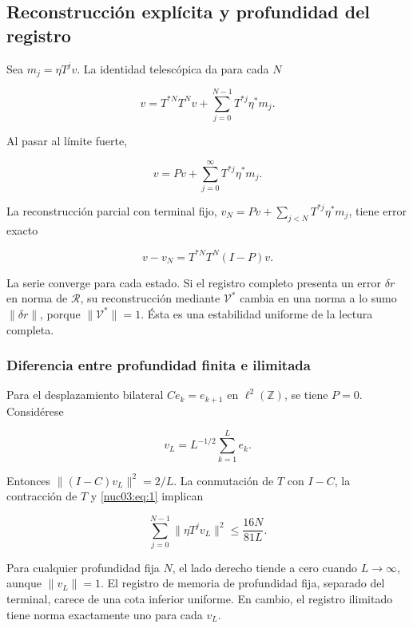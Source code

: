 \subsection{Reconstrucción explícita y profundidad del registro}

Sea \(m_j=\eta T^jv\). La identidad telescópica da para cada \(N\)

\begin{equation}
\boxed{v=T^{*N}T^Nv+\sum_{j=0}^{N-1}T^{*j}\eta^*m_j.}
\label{nuc03:eq:8}
\end{equation}

Al pasar al límite fuerte,

\begin{equation}
\boxed{v=Pv+\sum_{j=0}^{\infty}T^{*j}\eta^*m_j.}
\label{nuc03:eq:9}
\end{equation}

La reconstrucción parcial con terminal fijo,
\(v_N=Pv+\sum_{j<N}T^{*j}\eta^*m_j\), tiene error exacto

\begin{equation}
v-v_N=T^{*N}T^N(I-P)v.
\label{nuc03:eq:10}
\end{equation}

La serie converge para cada estado. Si el registro completo presenta un error \(\delta r\) en norma de \(\mathcal R\), su reconstrucción mediante \(\mathcal V^*\) cambia en una norma a lo sumo \(\|\delta r\|\), porque \(\|\mathcal V^*\|=1\). Ésta es una estabilidad uniforme de la lectura completa.

\subsubsection{Diferencia entre profundidad finita e ilimitada}

Para el desplazamiento bilateral \(Ce_k=e_{k+1}\) en \(\ell^2(\mathbb Z)\), se tiene \(P=0\). Considérese

\[
v_L=L^{-1/2}\sum_{k=1}^{L}e_k.
\]

Entonces \(\|(I-C)v_L\|^2=2/L\). La conmutación de \(T\) con \(I-C\), la contracción de \(T\) y \eqref{nuc03:eq:1} implican

\begin{equation}
\sum_{j=0}^{N-1}\|\eta T^jv_L\|^2
\leq\frac{16N}{81L}.
\label{nuc03:eq:11}
\end{equation}

Para cualquier profundidad fija \(N\), el lado derecho tiende a cero cuando \(L\to\infty\), aunque \(\|v_L\|=1\). El registro de memoria de profundidad fija, separado del terminal, carece de una cota inferior uniforme. En cambio, el registro ilimitado tiene norma exactamente uno para cada \(v_L\).

